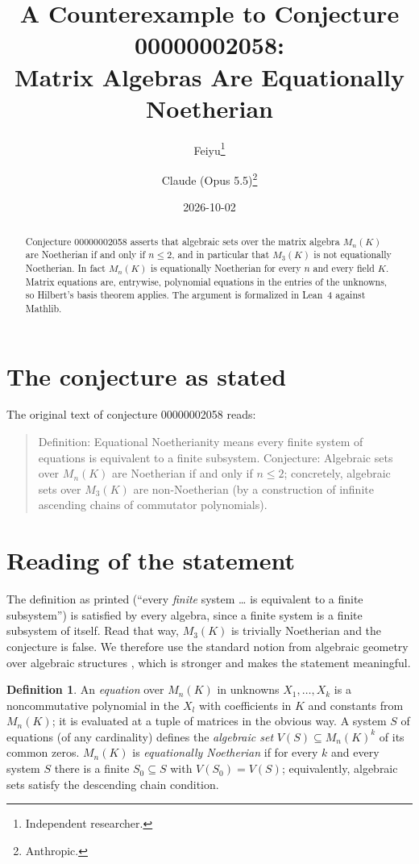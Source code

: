 \documentclass[11pt]{article}
\title{A Counterexample to Conjecture 00000002058:\\
Matrix Algebras Are Equationally Noetherian}
\author{%
  Feiyu\thanks{Independent researcher.}
  \and
  Claude (Opus 5.5)\thanks{Anthropic.}%
}
\date{2026-10-02}
\theoremstyle{plain}
\theoremstyle{definition}
\newtheorem{definition}[theorem]{Definition}
\theoremstyle{remark}
\begin{document}
\maketitle

\begin{abstract}
Conjecture 00000002058 asserts that algebraic sets over the matrix algebra
$M_n(K)$ are Noetherian if and only if $n\le2$, and in particular that $M_3(K)$
is not equationally Noetherian. In fact $M_n(K)$ is equationally Noetherian for
every $n$ and every field $K$. Matrix equations are, entrywise, polynomial
equations in the entries of the unknowns, so Hilbert's basis theorem applies.
The argument is formalized in Lean~4 against Mathlib.
\end{abstract}

\section{The conjecture as stated}

The original text of conjecture 00000002058 reads:

\begin{quote}
Definition: Equational Noetherianity means every finite system of equations is
equivalent to a finite subsystem. Conjecture: Algebraic sets over $M_n(K)$ are
Noetherian if and only if $n \le 2$; concretely, algebraic sets over $M_3(K)$ are
non-Noetherian (by a construction of infinite ascending chains of commutator
polynomials).
\end{quote}

\section{Reading of the statement}

The definition as printed (``every \emph{finite} system \ldots{} is equivalent
to a finite subsystem'') is satisfied by every algebra, since a finite system
is a finite subsystem of itself. Read that way, $M_3(K)$ is trivially
Noetherian and the conjecture is false. We therefore use the standard notion
from algebraic geometry over algebraic structures \cite{bmr}, which is
stronger and makes the statement meaningful.

\begin{definition}
An \emph{equation} over $M_n(K)$ in unknowns $X_1,\ldots,X_k$ is a
noncommutative polynomial in the $X_l$ with coefficients in $K$ and constants
from $M_n(K)$; it is evaluated at a tuple of matrices in the obvious way. A system
$S$ of equations (of any cardinality) defines the \emph{algebraic set}
$V(S)\subseteq M_n(K)^k$ of its common zeros. $M_n(K)$ is \emph{equationally
Noetherian} if for every $k$ and every system $S$ there is a finite $S_0\subseteq
S$ with $V(S_0)=V(S)$; equivalently, algebraic sets satisfy the descending chain
condition.
\end{definition}
\end{document}

